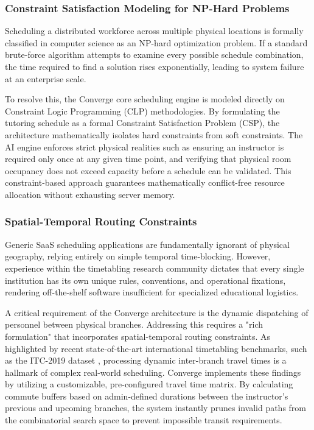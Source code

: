 \subsubsection{Constraint Satisfaction Modeling for NP-Hard Problems}
Scheduling a distributed workforce across multiple physical locations is formally classified in computer science as an NP-hard optimization problem. If a standard brute-force algorithm attempts to examine every possible schedule combination, the time required to find a solution rises exponentially, leading to system failure at an enterprise scale.

To resolve this, the Converge core scheduling engine is modeled directly on Constraint Logic Programming (CLP) methodologies\cite{elsakka2015}. By formulating the tutoring schedule as a formal Constraint Satisfaction Problem (CSP), the architecture mathematically isolates hard constraints from soft constraints. The AI engine enforces strict physical realities such as ensuring an instructor is required only once at any given time point, and verifying that physical room occupancy does not exceed capacity before a schedule can be validated. This constraint-based approach guarantees mathematically conflict-free resource allocation without exhausting server memory.
\subsubsection{Spatial-Temporal Routing Constraints}
Generic SaaS scheduling applications are fundamentally ignorant of physical geography, relying entirely on simple temporal time-blocking. However, experience within the timetabling research community dictates that every single institution has its own unique rules, conventions, and operational fixations, rendering off-the-shelf software insufficient for specialized educational logistics\cite{ceschia2022}.

A critical requirement of the Converge architecture is the dynamic dispatching of personnel between physical branches. Addressing this requires a "rich formulation" that incorporates spatial-temporal routing constraints. As highlighted by recent state-of-the-art international timetabling benchmarks, such as the ITC-2019 dataset \cite{ceschia2022}, processing dynamic inter-branch travel times is a hallmark of complex real-world scheduling. Converge implements these findings by utilizing a customizable, pre-configured travel time matrix. By calculating commute buffers based on admin-defined durations between the instructor's previous and upcoming branches, the system instantly prunes invalid paths from the combinatorial search space to prevent impossible transit requirements.
